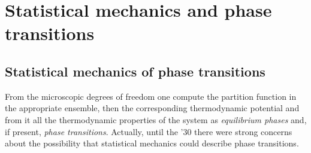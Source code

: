 \documentclass[../main/main.tex]{subfiles}
\begin{document}
\chapter{Statistical mechanics and phase transitions}


\section{Statistical mechanics of phase transitions}

From the microscopic degrees of freedom one compute the partition function in the appropriate ensemble, then the corresponding thermodynamic potential and from it all the thermodynamic properties of the system as \emph{equilibrium phases} and, if present, \emph{phase transitions}. Actually, until the '30 there were strong concerns about the possibility that statistical mechanics could describe phase transitions.

\begin{figure}[h!]
\begin{minipage}[c]{0.5\linewidth}
\centering
{}
\end{minipage}
\begin{minipage}[]{0.5\linewidth}
\centering
{}
\end{minipage}
\caption{\label{fig:} }
\end{figure}
\end{document}
